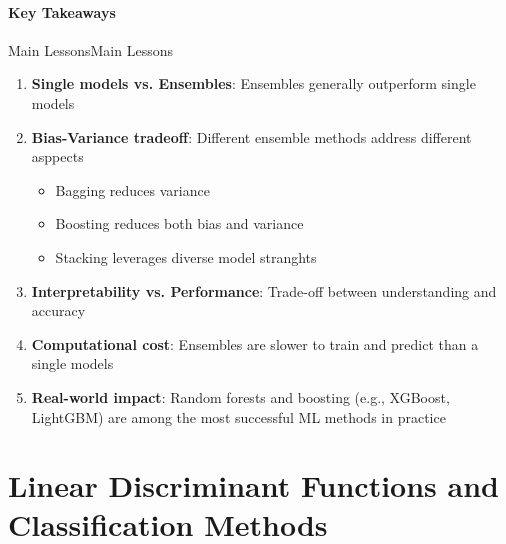 \documentclass[a4paper]{article}
\theoremstyle{definition}
\begin{document}
\subsection{Key Takeaways}
\begin{definition}{Main Lessons}{Main Lessons}
\begin{enumerate}
    \item \textbf{Single models vs. Ensembles}: Ensembles generally outperform single models 
    \item \textbf{Bias-Variance tradeoff}: Different ensemble methods address different asppects 
    \begin{itemize}
        \item Bagging reduces variance 
        \item Boosting reduces both bias and variance 
        \item Stacking leverages diverse model stranghts
    \end{itemize}
    \item \textbf{Interpretability vs. Performance}: Trade-off between understanding and accuracy 
    \item \textbf{Computational cost}: Ensembles are slower to train and predict than a single models 
    \item \textbf{Real-world impact}: Random forests and boosting (e.g., XGBoost, LightGBM) are among the most successful ML methods in practice
\end{enumerate}
\end{definition}
\part{Linear Discriminant Functions and Classification Methods}
\end{document}
